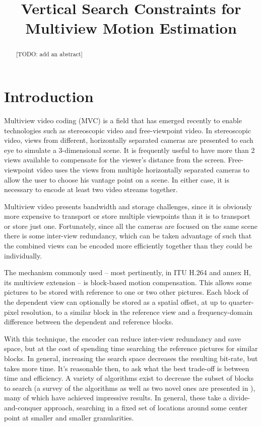 \documentclass[twoside, 11pt]{article}
\title{\vspace{-15mm}%
	\fontsize{24pt}{10pt}\selectfont
	\textbf{Vertical Search Constraints for Multiview Motion Estimation}
	}
\author{}
\date{}
\begin{document}

\maketitle
\thispagestyle{fancy}

\begin{abstract}
[TODO: add an abstract]
\end{abstract}

\section{Introduction} %
\label{sec:introduction} %
Multiview video coding (MVC) is a field that has emerged recently to
enable technologies such as stereoscopic video and free-viewpoint video. In
stereoscopic video, views from different, horizontally separated cameras are
presented to each eye to simulate a 3-dimensional scene. It is frequently useful
to have more than 2 views available to compensate for the viewer's distance from
the screen. Free-viewpoint video uses the views from multiple horizontally
separated cameras to allow the user to choose his vantage point on a scene. In
either case, it is necessary to encode at least two video streams together.

Multiview video presents bandwidth and storage challenges, since it is obviously
more expensive to transport or store multiple viewpoints than it is to transport
or store just one. Fortunately, since all the cameras are focused on the same
scene there is some inter-view redundancy, which can be taken advantage of such
that the combined views can be encoded more efficiently together than they could
be individually.

The mechanism commonly used -- most pertinently, in ITU H.264 and annex H, its
multiview extension -- is block-based motion compensation. This allows some
pictures to be stored with reference to one or two other pictures. Each block
of the dependent view can optionally be stored as a spatial offset, at up to
quarter-pixel resolution, to a similar block in the reference view and a
frequency-domain difference between the dependent and reference blocks.

With this technique, the encoder can reduce inter-view redundancy and save
space, but at the cost of spending time searching the reference pictures for
similar blocks. In general, increasing the search space decreases the resulting
bit-rate, but takes more time. It's reasonable then, to ask what the best
trade-off is between time and efficiency. A variety of algorithms exist to
decrease the subset of blocks to search (a survey of the algorithms as well as
two novel ones are presented in \cite{kha13}), many of which have achieved
impressive results. In general, these take a divide-and-conquer approach,
searching in a fixed set of locations around some center point at smaller and
smaller granularities.
\end{document}
